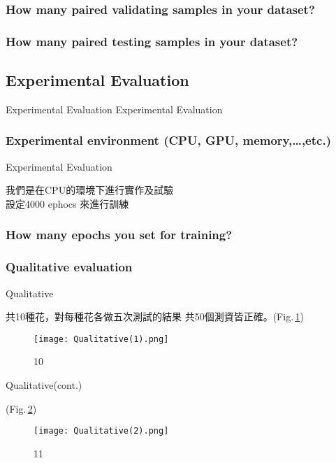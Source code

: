 \documentclass{beamer}
\begin{document}
\subsubsection{How many paired validating samples in your dataset?}


\subsubsection{How many paired testing samples in your dataset?}


\subsection{Experimental Evaluation }
\begin{frame}{Experimental Evaluation}
\center \huge Experimental Evaluation
\end{frame}

\subsubsection{Experimental environment (CPU, GPU, memory,…,etc.)}
\begin{frame}{Experimental Evaluation}
 \begin{CJK}{UTF8}{bkai}
我們是在CPU的環境下進行實作及試驗\\ \bigskip
設定4000 ephocs 來進行訓練
\end{CJK}
\end{frame}

\subsubsection{How many epochs you set for training?}


\subsubsection{Qualitative evaluation}
\begin{frame}{Qualitative}
\begin{CJK}{UTF8}{bkai}
\small 共10種花，對每種花各做五次測試的結果 共50個測資皆正確。(Fig.\,\ref{fig:10})
 \end{CJK}
 \begin{figure}
    \texttt{[image: Qualitative(1).png]}
    \caption{10}
    \label{fig:10}
  \end{figure}
\end{frame}


\begin{frame}{Qualitative(cont.)}
\begin{CJK}{UTF8}{bkai}
(Fig.\,\ref{fig:11})
\end{CJK}
 \begin{figure}
    \texttt{[image: Qualitative(2).png]}
    \caption{11}
    \label{fig:11}
  \end{figure}
\end{frame}
\end{document}
